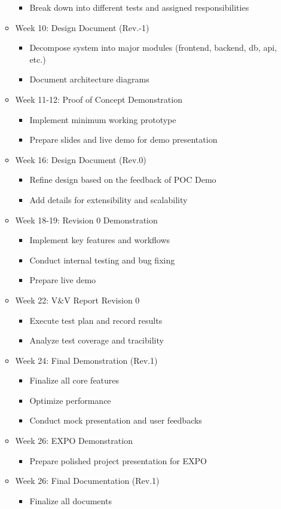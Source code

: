 \documentclass{article}
\begin{document}
\begin{itemize}
\begin{itemize}
\begin{itemize}
			\item Break down into different tests and assigned responsibilities
			\end{itemize}
		\item Week 10: Design Document (Rev.-1)
			\begin{itemize}
			\item Decompose system into major modules (frontend, backend, db, api, etc.)
			\item Document architecture diagrams
			\end{itemize}
		\item Week 11-12: Proof of Concept Demonstration
			\begin{itemize}
			\item Implement minimum working prototype
			\item Prepare slides and live demo for demo presentation
			\end{itemize}
		\item Week 16: Design Document (Rev.0)
			\begin{itemize}
			\item Refine design based on the feedback of POC Demo
			\item Add details for extensibility and scalability
			\end{itemize}	
		\item Week 18-19: Revision 0  Demonstration
			\begin{itemize}
			\item Implement key features and workflows
			\item Conduct internal testing and bug fixing
			\item Prepare live demo
			\end{itemize}	
		\item Week 22: V\&V Report Revision 0
			\begin{itemize}
			\item Execute test plan and record results
			\item Analyze test coverage and tracibility
			\end{itemize}	
		\item Week 24: Final Demonstration (Rev.1)
			\begin{itemize}
			\item Finalize all core features
			\item Optimize performance
			\item Conduct mock presentation and user feedbacks
			\end{itemize}	
		\item Week 26: EXPO Demonstration
			\begin{itemize}
			\item Prepare polished project presentation for EXPO
			\end{itemize}	
		\item Week 26: Final Documentation (Rev.1)
			\begin{itemize}
			\item Finalize all documents
			\end{itemize}	
	\end{itemize}
\end{itemize}
\end{document}
